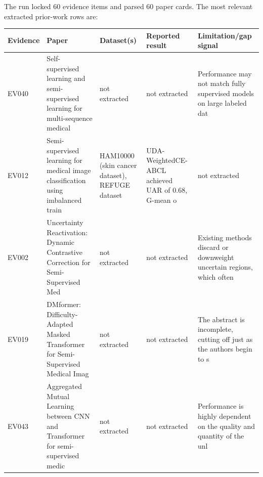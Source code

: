 \documentclass[
  11pt,
]{article}
\newcounter{none} %
\begin{document}
The run locked 60 evidence items and parsed 60 paper cards. The most relevant extracted prior-work rows are:

{\def\LTcaptype{none} %
\begin{longtable}[]{@{}
  >{\raggedright\arraybackslash}p{}
  >{\raggedright\arraybackslash}p{}
  >{\raggedright\arraybackslash}p{}
  >{\raggedright\arraybackslash}p{}
  >{\raggedright\arraybackslash}p{}@{}}
\toprule\noalign{}
\begin{minipage}[b]{\linewidth}\raggedright
Evidence
\end{minipage} & \begin{minipage}[b]{\linewidth}\raggedright
Paper
\end{minipage} & \begin{minipage}[b]{\linewidth}\raggedright
Dataset(s)
\end{minipage} & \begin{minipage}[b]{\linewidth}\raggedright
Reported result
\end{minipage} & \begin{minipage}[b]{\linewidth}\raggedright
Limitation/gap signal
\end{minipage} \\
\midrule\noalign{}
\endhead
\bottomrule\noalign{}
\endlastfoot
EV040 & Self-supervised learning and semi-supervised learning for multi-sequence medical & not extracted & not extracted & Performance may not match fully supervised models on large labeled dat \\
EV012 & Semi-supervised learning for medical image classification using imbalanced train & HAM10000 (skin cancer dataset), REFUGE dataset & UDA-WeightedCE-ABCL achieved UAR of 0.68, G-mean o & not extracted \\
EV002 & Uncertainty Reactivation: Dynamic Contrastive Correction for Semi-Supervised Med & not extracted & not extracted & Existing methods discard or downweight uncertain regions, which often \\
EV019 & DMformer: Difficulty-Adapted Masked Transformer for Semi-Supervised Medical Imag & not extracted & not extracted & The abstract is incomplete, cutting off just as the authors begin to s \\
EV043 & Aggregated Mutual Learning between CNN and Transformer for semi-supervised medic & not extracted & not extracted & Performance is highly dependent on the quality and quantity of the unl \\

\end{longtable}}
\end{document}
